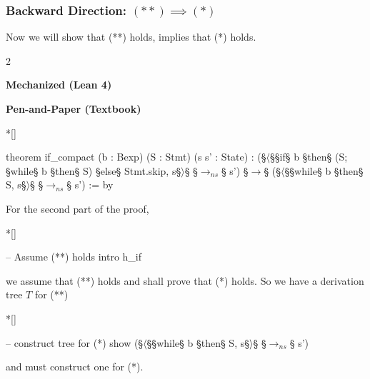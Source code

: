 \subsubsection*{Backward Direction: $(**) \implies (*)$}
Now we will show that (**) holds, implies that (*) holds.
\begin{paracol}{2}
\begin{leftcolumn}
    \centering \textbf{Mechanized (Lean 4)}
\end{leftcolumn}
\begin{rightcolumn}
    \centering \textbf{Pen-and-Paper (Textbook)} \\\noindent
\end{rightcolumn}

\switchcolumn[1]*[]
\begin{leftcolumn}
    \begin{Lean_Code}
theorem if_compact (b : Bexp)
  (S : Stmt) (s s' : State) :
  (§\(\langle\)§§if§ b
  §then§ (S; §while§ b §then§ S)
  §else§ Stmt.skip, s§\(\rangle\)§ §\(\to_{ns}\)§ s')
  §\(\to\)§
  (§\(\langle\)§§while§ b §then§ S, s§\(\rangle\)§ §\(\to_{ns}\)§ s')
  := by
    \end{Lean_Code}
\end{leftcolumn}
\begin{rightcolumn} \noindent
For the second part of the proof,
\end{rightcolumn}
\vspace{1.5em}

\switchcolumn[1]*[]
\begin{leftcolumn}
    \begin{Lean_Code}
  -- Assume (**) holds
  intro h_if
    \end{Lean_Code}
\end{leftcolumn}
\begin{rightcolumn} \noindent
we assume that (**) holds and shall prove
that (*) holds. So we have a derivation tree \(T\) for (**)
\end{rightcolumn}
\vspace{1.5em}

\switchcolumn[1]*[]
\begin{leftcolumn}
    \begin{Lean_Code}
  -- construct tree for (*)
  show (§\(\langle\)§§while§ b §then§ S, s§\(\rangle\)§
    §\(\to_{ns}\)§ s')
    \end{Lean_Code}
\end{leftcolumn}
\begin{rightcolumn} \noindent
and must construct one for (*).
\end{rightcolumn}
\vspace{1.5em}


\end{paracol}
